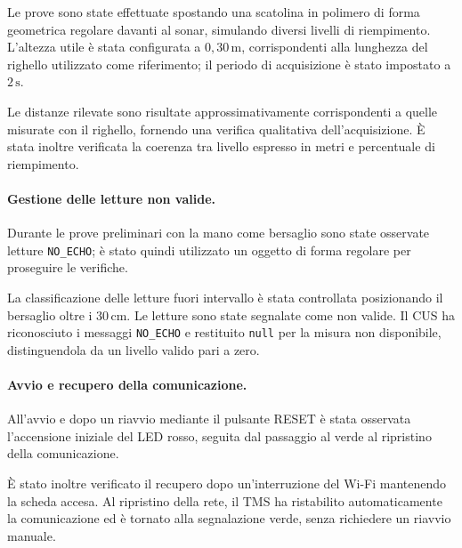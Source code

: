 Le prove sono state effettuate spostando una scatolina
in polimero di forma geometrica regolare davanti
al sonar, simulando diversi livelli di riempimento.
L'altezza utile è stata configurata a
\(0{,}30\,\mathrm{m}\), corrispondenti alla lunghezza
del righello utilizzato come riferimento;
il periodo di acquisizione è stato impostato
a \(2\,\mathrm{s}\).

Le distanze rilevate sono risultate approssimativamente
corrispondenti a quelle misurate con il righello,
fornendo una verifica qualitativa dell'acquisizione.
È stata inoltre verificata la coerenza tra livello
espresso in metri e percentuale di riempimento.

\paragraph{Gestione delle letture non valide.}

Durante le prove preliminari con la mano come bersaglio
sono state osservate letture \texttt{NO\_ECHO};
è stato quindi utilizzato un oggetto di forma regolare
per proseguire le verifiche.

La classificazione delle letture fuori intervallo
è stata controllata posizionando il bersaglio
oltre i \(30\,\mathrm{cm}\).
Le letture sono state segnalate come non valide.
Il CUS ha riconosciuto i messaggi \texttt{NO\_ECHO}
e restituito \texttt{null} per la misura non disponibile,
distinguendola da un livello valido pari a zero.

\paragraph{Avvio e recupero della comunicazione.}

All'avvio e dopo un riavvio mediante il pulsante RESET
è stata osservata l'accensione iniziale del LED rosso,
seguita dal passaggio al verde al ripristino
della comunicazione.

È stato inoltre verificato il recupero dopo
un'interruzione del Wi-Fi mantenendo la scheda accesa.
Al ripristino della rete, il TMS ha ristabilito
automaticamente la comunicazione ed è tornato
alla segnalazione verde, senza richiedere
un riavvio manuale.
